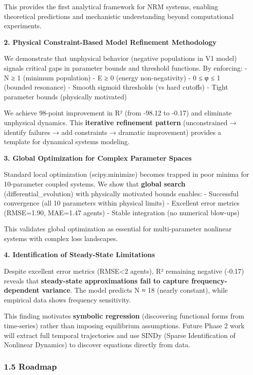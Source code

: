 \documentclass[
]{article}
\begin{document}
This provides the first analytical framework for NRM systems, enabling
theoretical predictions and mechanistic understanding beyond
computational experiments.

\textbf{2. Physical Constraint-Based Model Refinement Methodology}

We demonstrate that unphysical behavior (negative populations in V1
model) signals critical gaps in parameter bounds and threshold
functions. By enforcing: - N ≥ 1 (minimum population) - E ≥ 0 (energy
non-negativity) - 0 ≤ φ ≤ 1 (bounded resonance) - Smooth sigmoid
thresholds (vs hard cutoffs) - Tight parameter bounds (physically
motivated)

We achieve 98-point improvement in R² (from -98.12 to -0.17) and
eliminate unphysical dynamics. This \textbf{iterative refinement
pattern} (unconstrained → identify failures → add constraints → dramatic
improvement) provides a template for dynamical systems modeling.

\textbf{3. Global Optimization for Complex Parameter Spaces}

Standard local optimization (scipy.minimize) becomes trapped in poor
minima for 10-parameter coupled systems. We show that \textbf{global
search} (differential\_evolution) with physically motivated bounds
enables: - Successful convergence (all 10 parameters within physical
limits) - Excellent error metrics (RMSE=1.90, MAE=1.47 agents) - Stable
integration (no numerical blow-ups)

This validates global optimization as essential for multi-parameter
nonlinear systems with complex loss landscapes.

\textbf{4. Identification of Steady-State Limitations}

Despite excellent error metrics (RMSE\textless2 agents), R² remaining
negative (-0.17) reveals that \textbf{steady-state approximations fail
to capture frequency-dependent variance}. The model predicts N ≈ 18
(nearly constant), while empirical data shows frequency sensitivity.

This finding motivates \textbf{symbolic regression} (discovering
functional forms from time-series) rather than imposing equilibrium
assumptions. Future Phase 2 work will extract full temporal trajectories
and use SINDy (Sparse Identification of Nonlinear Dynamics) to discover
equations directly from data.

\subsubsection{1.5 Roadmap}\label{roadmap}
\end{document}
